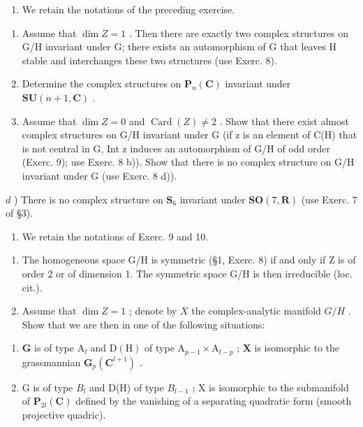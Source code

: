 \begin{enumerate}
\def\labelenumi{\arabic{enumi})}
\setcounter{enumi}{9}
\tightlist
\item
  We retain the notations of the preceding exercise.
\end{enumerate}

\begin{enumerate}
\def\labelenumi{\alph{enumi})}
\item
  Assume that \(\dim Z = 1\) . Then there are exactly two complex structures on G/H invariant under G; there exists an automorphism of G that leaves H stable and interchanges these two structures (use Exerc. 8).
\item
  Determine the complex structures on \(\mathbf{P}_n(\mathbf{C})\) invariant under \(\mathbf{SU}(n + 1,\mathbf{C})\) .
\item
  Assume that \(\dim Z = 0\) and \(\operatorname{Card}(Z) \neq 2\) . Show that there exist almost complex structures on G/H invariant under G (if z is an element of C(H) that is not central in G, Int z induces an automorphism of G/H of odd order (Exerc. 9); use Exerc. 8 b)). Show that there is no complex structure on G/H invariant under G (use Exerc. 8 d)).
\end{enumerate}

\(d\) ) There is no complex structure on \(\mathbf{S}_6\) invariant under \(\mathbf{SO}(7,\mathbf{R})\) (use Exerc. 7 of §3).

\begin{enumerate}
\def\labelenumi{\arabic{enumi})}
\setcounter{enumi}{10}
\tightlist
\item
  We retain the notations of Exerc. 9 and 10.
\end{enumerate}

\begin{enumerate}
\def\labelenumi{\alph{enumi})}
\item
  The homogeneous space G/H is symmetric (§1, Exerc. 8) if and only if Z is of order 2 or of dimension 1. The symmetric space G/H is then irreducible (loc. cit.).
\item
  Assume that \(\dim Z = 1\) ; denote by \(X\) the complex-analytic manifold \(G / H\) . Show that we are then in one of the following situations:
\end{enumerate}

\begin{enumerate}
\def\labelenumi{(\roman{enumi})}
\item
  \(\mathbf{G}\) is of type \(\mathrm{A}_l\) and \(\mathrm{D(H)}\) of type \(\mathrm{A}_{p - 1}\times \mathrm{A}_{l - p}\) ; \(\mathbf{X}\) is isomorphic to the grassmannian \(\mathbf{G}_p(\mathbf{C}^{l + 1})\) .
\item
  G is of type \(B_{l}\) and D(H) of type \(B_{l-1}\) ; X is isomorphic to the submanifold of \(\mathbf{P}_{2l}(\mathbf{C})\) defined by the vanishing of a separating quadratic form (smooth projective quadric).
\end{enumerate}

